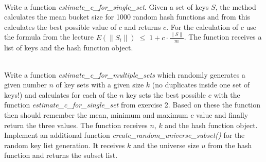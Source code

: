  \\
Write a function \textit{estimate\_c\_for\_single\_set}.
Given a set of keys $S$, the method calculates the mean bucket size for 1000
random hash functions and from this calculates the best possible value of $c$
and returns $c$.
For the calculation of $c$ use the formula from the lecture
$E(\|S_i\|) \; \leq \; 1 + c \cdot \frac{\|S\|}{m}$. The function receives a list of keys and the hash function object.

 \\

Write a function \emph{estimate\_c\_for\_multiple\_sets} which randomly generates a given number $n$ of key sets with 
a given size $k$ (no duplicates inside one set of keys!) and calculates for each of the $n$ key sets the best 
possible $c$ with the function \textit{estimate\_c\_for\_single\_set} from exercise 2. Based on these the function then should remember the mean, minimum 
and maximum $c$ value and finally return the three values. The function receives $n$, $k$ and the hash function object. Implement an additional function \textit{create\_random\_universe\_subset()} for the random key list generation. It receives $k$ and the universe size $u$ from the hash function and returns the subset list.

